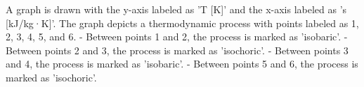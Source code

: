 A graph is drawn with the y-axis labeled as 'T [K]' and the x-axis labeled as 's [kJ/kg·K]'. The graph depicts a thermodynamic process with points labeled as 1, 2, 3, 4, 5, and 6.  
- Between points 1 and 2, the process is marked as 'isobaric'.  
- Between points 2 and 3, the process is marked as 'isochoric'.  
- Between points 3 and 4, the process is marked as 'isobaric'.  
- Between points 5 and 6, the process is marked as 'isochoric'.